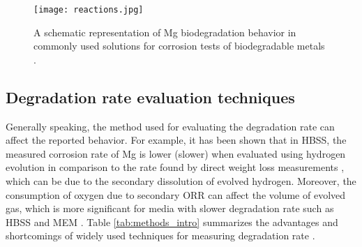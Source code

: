 \begin{figure}
\centering
\medskip
\texttt{[image: reactions.jpg]}
\caption[Mg biodegradation behavior in commonly used test solutions]{A schematic representation of Mg biodegradation behavior in commonly used solutions for corrosion tests of biodegradable metals \cite{Mei2020}.} \label{fig:reactions_intro}
\end{figure}



\subsection{Degradation rate evaluation techniques}

Generally speaking, the method used for evaluating the degradation rate can affect the reported behavior. For example, it has been shown that in HBSS, the measured corrosion rate of Mg is lower (slower) when evaluated using  hydrogen evolution in comparison to the rate found by direct weight loss measurements \cite{Johnston2015,Johnston2019}, which can be due to the secondary dissolution of evolved hydrogen. Moreover, the consumption of oxygen due to secondary ORR can affect the volume of evolved gas, which is more significant for media with slower degradation rate such as HBSS and MEM \cite{Wang2020}. Table \ref{tab:methods_intro} summarizes the advantages and shortcomings of widely used techniques for measuring degradation rate \cite{Mei2020}. 


